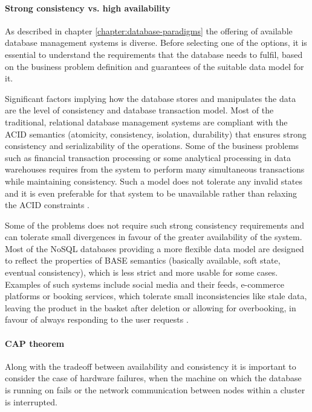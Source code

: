 \paragraph{Strong consistency vs. high availability}

As described in chapter \ref{chapter:database-paradigms} the offering of available database management systems is diverse. Before selecting one of the options, it is essential to understand the requirements that the database needs to fulfil, based on the business problem definition and guarantees of the suitable data model for it. 

Significant factors implying how the database stores and manipulates the data are the level of consistency and database transaction model. Most of the traditional, relational database management systems are compliant with the ACID semantics (atomicity, consistency, isolation, durability) that ensures strong consistency and serializability of the operations. Some of the business problems such as financial transaction processing or some analytical processing in data warehouses requires from the system to perform many simultaneous transactions while maintaining consistency. Such a model does not tolerate any invalid states and it is even preferable for that system to be unavailable rather than relaxing the ACID constraints \cite{PerspectivesOnArchitectureEvolution}.

Some of the problems does not require such strong consistency requirements and can tolerate small divergences in favour of the greater availability of the system. Most of the NoSQL databases providing a more flexible data model are designed to reflect the properties of BASE semantics (basically available, soft state, eventual consistency), which is less strict and more usable for some cases. Examples of such systems include social media and their feeds, e-commerce platforms or booking services, which tolerate small inconsistencies like stale data, leaving the product in the basket after deletion or allowing for overbooking, in favour of always responding to the user requests \cite{NoSQLDatabaseSystemsSurveyDecisionGuidance}.

\paragraph{CAP theorem}

Along with the tradeoff between availability and consistency it is important to consider the case of hardware failures, when the machine on which the database is running on fails or the network communication between nodes within a cluster is interrupted. 

